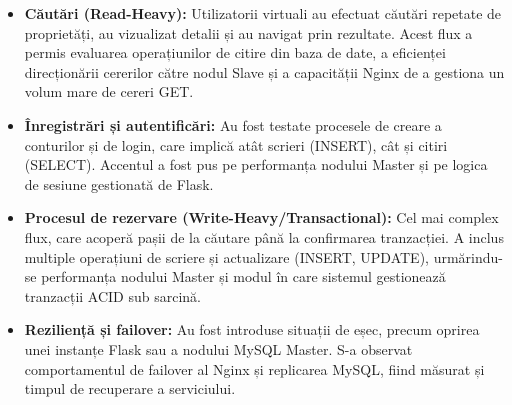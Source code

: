 \documentclass[12pt, a4paper, oneside, romanian]{teza-upb}
\begin{document}
\begin{itemize}
\item \textbf{Căutări (Read-Heavy):}  
Utilizatorii virtuali au efectuat căutări repetate de proprietăți, au vizualizat detalii și au navigat prin rezultate. Acest flux a permis evaluarea operațiunilor de citire din baza de date, a eficienței direcționării cererilor către nodul Slave și a capacității Nginx de a gestiona un volum mare de cereri GET.  

\item \textbf{Înregistrări și autentificări:}  
Au fost testate procesele de creare a conturilor și de login, care implică atât scrieri (INSERT), cât și citiri (SELECT). Accentul a fost pus pe performanța nodului Master și pe logica de sesiune gestionată de Flask.  

\item \textbf{Procesul de rezervare (Write-Heavy/Transactional):}  
Cel mai complex flux, care acoperă pașii de la căutare până la confirmarea tranzacției. A inclus multiple operațiuni de scriere și actualizare (INSERT, UPDATE), urmărindu-se performanța nodului Master și modul în care sistemul gestionează tranzacții ACID sub sarcină.  

\item \textbf{Reziliență și failover:}  
Au fost introduse situații de eșec, precum oprirea unei instanțe Flask sau a nodului MySQL Master. S-a observat comportamentul de failover al Nginx și replicarea MySQL, fiind măsurat și timpul de recuperare a serviciului.  


\end{itemize}
\end{document}
